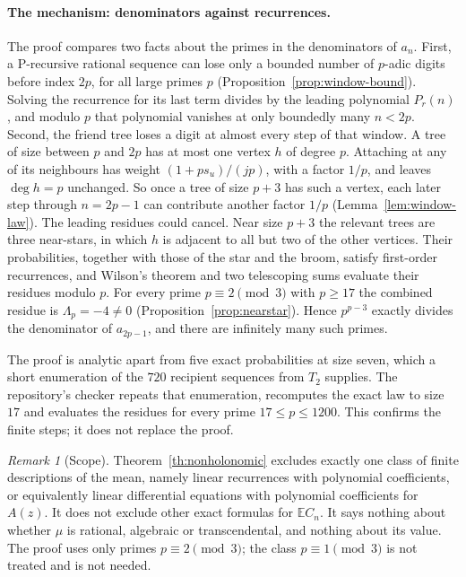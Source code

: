 \documentclass[11pt]{article}
\theoremstyle{remark}
\newtheorem*{remark}{Remark}
\newcommand{\E}{\mathbb E}
\begin{document}
\paragraph{The mechanism: denominators against recurrences.} The proof compares two facts about the primes in the denominators of $a_n$.
First, a P-recursive rational sequence can lose only a bounded number of $p$-adic digits before index $2p$, for all large primes $p$ (Proposition~\ref{prop:window-bound}). Solving the recurrence for its last term divides by the leading polynomial $P_r(n)$, and modulo $p$ that polynomial vanishes at only boundedly many $n<2p$.
Second, the friend tree loses a digit at almost every step of that window. A tree of size between $p$ and $2p$ has at most one vertex $h$ of degree $p$. Attaching at any of its neighbours has weight $(1+ps_u)/(jp)$, with a factor $1/p$, and leaves $\deg h=p$ unchanged. So once a tree of size $p+3$ has such a vertex, each later step through $n=2p-1$ can contribute another factor $1/p$ (Lemma~\ref{lem:window-law}). The leading residues could cancel. Near size $p+3$ the relevant trees are three near-stars, in which $h$ is adjacent to all but two of the other vertices. Their probabilities, together with those of the star and the broom, satisfy first-order recurrences, and Wilson's theorem and two telescoping sums evaluate their residues modulo $p$. For every prime $p\equiv2\pmod3$ with $p\ge17$ the combined residue is $\Lambda_p=-4\ne0$ (Proposition~\ref{prop:nearstar}). Hence $p^{p-3}$ exactly divides the denominator of $a_{2p-1}$, and there are infinitely many such primes.

The proof is analytic apart from five exact probabilities at size seven, which a short enumeration of the $720$ recipient sequences from $T_2$ supplies. The repository's checker repeats that enumeration, recomputes the exact law to size $17$ and evaluates the residues for every prime $17\le p\le1200$. This confirms the finite steps; it does not replace the proof.

\begin{remark}[Scope]
Theorem~\ref{th:nonholonomic} excludes exactly one class of finite descriptions of the mean, namely linear recurrences with polynomial coefficients, or equivalently linear differential equations with polynomial coefficients for $A(z)$. It does not exclude other exact formulas for $\E C_n$. It says nothing about whether $\mu$ is rational, algebraic or transcendental, and nothing about its value. The proof uses only primes $p\equiv2\pmod3$; the class $p\equiv1\pmod3$ is not treated and is not needed.
\end{remark}
\end{document}

